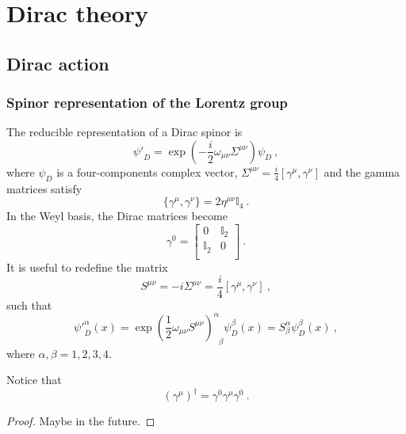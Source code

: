 \part{Dirac theory}

\chapter{Dirac action}

\section{Spinor representation of the Lorentz group}    

    The reducible representation of a Dirac spinor is 
    \begin{equation*}
        {\psi'}_D = \exp(-\frac{i}{2} \omega_{\mu\nu} \Sigma^{\mu\nu}) \psi_D ~,
    \end{equation*}
    where $\psi_D$ is a four-components complex vector, $\Sigma^{\mu\nu} = \frac{i}{4} [\gamma^\mu, \gamma^\nu]$ and the gamma matrices satisfy 
    \begin{equation*}
        \{\gamma^\mu, \gamma^\nu\} = 2 \eta^{\mu\nu} \mathbb I_4 ~.
    \end{equation*}
    In the Weyl basis, the Dirac matrices become 
    \begin{equation*}
        \gamma^0 = \begin{bmatrix}
            0 & \mathbb I_2 \\ \mathbb I_2 & 0 \\ 
        \end{bmatrix} ~.
    \end{equation*}
    It is useful to redefine the matrix 
    \begin{equation*}
        S^{\mu\nu} = - i \Sigma^{\mu\nu} = \frac{i}{4} [\gamma^\mu, \gamma^\nu] ~,
    \end{equation*}
    such that 
    \begin{equation}\label{lorspin}
        {\psi'}_D^\alpha (x) = \exp(\frac{1}{2} \omega_{\mu\nu} S^{\mu\nu})^\alpha_{\phantom \alpha \beta} \psi^\beta_D (x) = S^\alpha_\beta \psi^\beta_D (x) ~,
    \end{equation}
    where $\alpha, \beta = 1,2,3,4$.

    Notice that 
    \begin{equation}\label{gammadag}
        (\gamma^\mu)^\dagger = \gamma^0 \gamma^\mu \gamma^0 ~.
    \end{equation}
    \begin{proof}
        Maybe in the future.
    \end{proof}

